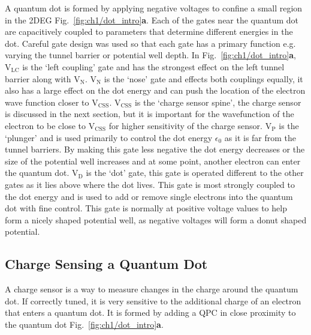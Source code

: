 A quantum dot is formed by applying negative voltages to confine a small region in the 2DEG Fig.~\ref{fig:ch1/dot_intro}\textbf{a}.
Each of the gates near the quantum dot are capacitively coupled to parameters that determine different energies in the dot. 
Careful gate design was used so that each gate has a primary function e.g. varying the tunnel barrier or potential well depth. In Fig.~\ref{fig:ch1/dot_intro}\textbf{a}, $\mathrm{V_{LC}}$ is the `left coupling' gate and has the strongest effect on the left tunnel barrier along with $\mathrm{V_{N}}$. $\mathrm{V_{N}}$ is the `nose' gate and effects both couplings equally, it also has a large effect on the dot energy and can push the location of the electron wave function closer to $\mathrm{V_{CSS}}$. $\mathrm{V_{CSS}}$ is the `charge sensor spine', the charge sensor is discussed in the next section, but it is important for the wavefunction of the electron to be close to $\mathrm{V_{CSS}}$ for higher sensitivity of the charge sensor. $\mathrm{V_{P}}$ is the `plunger' and is used primarily to control the dot energy $\epsilon_0$ as it is far from the tunnel barriers. By making this gate less negative the dot energy decreases or the size of the potential well increases and at some point, another electron can enter the quantum dot. $\mathrm{V_{D}}$ is the `dot' gate, this gate is operated different to the other gates as it lies above where the dot lives. This gate is most strongly coupled to the dot energy and is used to add or remove single electrons into the quantum dot with fine control. This gate is normally at positive voltage values to help form a nicely shaped potential well, as negative voltages will form a donut shaped potential. 





\afterpage{\clearpage}
\subsection{Charge Sensing a Quantum Dot}


A charge sensor is a way to measure changes in the charge around the quantum dot. If correctly tuned, it is very sensitive to the additional charge of an electron that enters a quantum dot. It is formed by adding a QPC in close proximity to the quantum dot Fig.~\ref{fig:ch1/dot_intro}\textbf{a}. 


